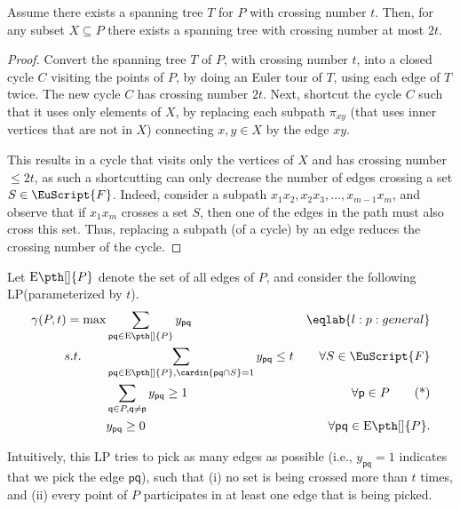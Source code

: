 \documentclass[12pt]{article}
\newcommand{\PntSet}{P}
\newcommand{\pnt}{\mathsf{p}}
\newcommand{\pntA}{\mathsf{q}}
\newcommand{\pairsX}[1]{\mathrm{E}\pth[]{#1}}
\newcommand{\Term}[1]{\textsf{#1}}
\newcommand{\LP}{\Term{L{}P}\xspace}
\newcommand{\Family}{\EuScript{F}}
\begin{document}
\begin{lemma}
    Assume there exists a spanning tree $T$ for $\PntSet$ with
    crossing number $t$. Then, for any subset $X \subseteq \PntSet$
    there exists a spanning tree with crossing number at most $2t$.

\end{lemma}

\begin{proof}
    Convert the spanning tree $T$ of $\PntSet$, with crossing number
    $t$, into a closed cycle $C$ visiting the points of $\PntSet$, by
    doing an Euler tour of $T$, using each edge of $T$ twice. The new
    cycle $C$ has crossing number $2t$.  Next, shortcut the cycle $C$
    such that it uses only elements of $X$, by replacing each subpath
    $\pi_{xy}$ (that uses inner vertices that are not in $X$)
    connecting $x,y \in X$ by the edge $xy$.

    This results in a cycle that visits only the vertices of $X$ and
    has crossing number $\leq 2t$, as such a shortcutting can only
    decrease the number of edges crossing a set $S \in
    \Family$. Indeed, consider a subpath $x_1 x_2, x_2x_3, \ldots,
    x_{m-1}x_m$, and observe that if $x_1x_m$ crosses a set $S$, then
    one of the edges in the path must also cross this set. Thus,
    replacing a subpath (of a cycle) by an edge reduces the crossing
    number of the cycle.
\end{proof}

\bigskip

Let $\pairsX{\PntSet}$ denote the set of all edges of $\PntSet$, and
consider the following \LP (parameterized by $t$).
\begin{align}
    \gamma(\PntSet,t) = \max & \sum_{\pnt\pntA \in \pairsX{\PntSet}}
    y_{\pnt \pntA} & \eqlab{l:p:general}  \\
\nonumber s.t. \quad\quad & \sum_{\substack{\pnt \pntA \in
          \pairsX{\PntSet},
\cardin{\pnt\pntA \cap S} = 1}} y_{\pnt\pntA} \leq t &
    \forall S \in \Family \\
\nonumber
    & \sum_{\substack{ \pntA \in \PntSet,\pntA \ne \pnt}}
    y_{\pnt\pntA} \geq 1 & \forall \pnt \in
    \PntSet \tag{*} \\
\nonumber
    & y_{\pnt\pntA} \geq 0 & \forall \pnt\pntA \in \pairsX{\PntSet}.
\end{align}

Intuitively, this \LP tries to pick as many edges as possible (i.e.,
$y_{\pnt \pntA} =1$ indicates that we pick the edge $\pnt \pntA$),
such that (i) no set is being crossed more than $t$ times, and (ii)
every point of $\PntSet$ participates in at least one edge that is
being picked.
\end{document}
